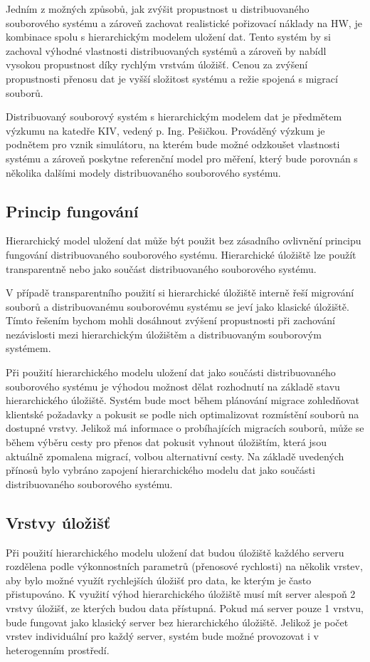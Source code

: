 \documentclass[czech,DP]{thesiskiv}
\begin{document}
Jedním z možných způsobů, jak zvýšit propustnost u distribuovaného souborového systému a zároveň zachovat realistické pořizovací náklady na HW, je kombinace spolu s hierarchickým modelem uložení dat. Tento systém by si zachoval výhodné vlastnosti distribuovaných systémů a zároveň by nabídl vysokou propustnost díky rychlým vrstvám úložišť. Cenou za zvýšení propustnosti přenosu dat je vyšší složitost systému a režie spojená s migrací souborů.

Distribuovaný souborový systém s hierarchickým modelem dat je předmětem výzkumu na katedře KIV, vedený p. Ing. Pešičkou. Prováděný výzkum je podnětem pro vznik simulátoru, na kterém bude možné odzkoušet vlastnosti systému a zároveň poskytne referenční model pro měření, který bude porovnán s několika dalšími modely distribuovaného souborového systému.

\subsection{Princip fungování}
Hierarchický model uložení dat může být použit bez zásadního ovlivnění principu fungování distribuovaného souborového systému. Hierarchické úložiště lze použít transparentně nebo jako součást distribuovaného souborového systému. 

V případě transparentního použití si hierarchické úložiště interně řeší migrování souborů a distribuovanému souborovému systému se jeví jako klasické úložiště. Tímto řešením bychom mohli dosáhnout zvýšení propustnosti při zachování nezávislosti mezi hierarchickým úložištěm a distribuovaným souborovým systémem.

Při použití hierarchického modelu uložení dat jako součásti distribuovaného souborového systému je výhodou možnost dělat rozhodnutí na základě stavu hierarchického úložiště. Systém bude moct během plánování migrace zohledňovat klientské požadavky a pokusit se podle nich optimalizovat rozmístění souborů na dostupné vrstvy. Jelikož má informace o probíhajících migracích souborů, může se během výběru cesty pro přenos dat pokusit vyhnout úložištím, která jsou aktuálně zpomalena migrací, volbou alternativní cesty. Na základě uvedených přínosů bylo vybráno zapojení hierarchického modelu dat jako součásti distribuovaného souborového systému.

\subsection{Vrstvy úložišť}
Při použití hierarchického modelu uložení dat budou úložiště každého serveru rozdělena podle výkonnostních parametrů (přenosové rychlosti) na několik vrstev, aby bylo možné využít rychlejších úložišť pro data, ke kterým je často přistupováno. K využití výhod hierarchického úložiště musí mít server alespoň 2 vrstvy úložišť, ze kterých budou data přístupná. Pokud má server pouze 1 vrstvu, bude fungovat jako klasický server bez hierarchického úložiště. Jelikož je počet vrstev individuální pro každý server, systém bude možné provozovat i v heterogenním prostředí.
\end{document}
